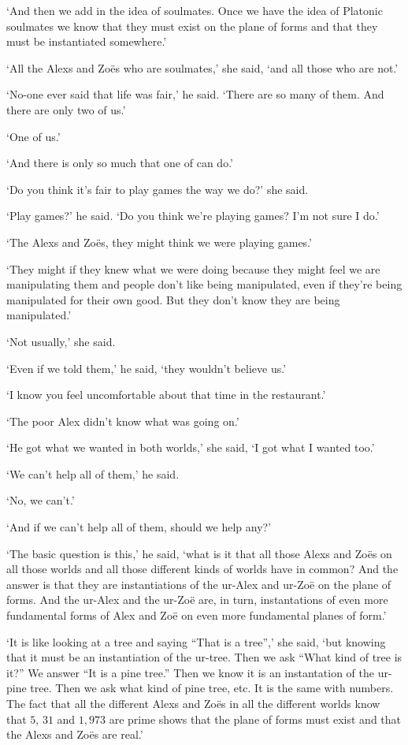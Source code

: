 `And then we add in the idea of soulmates. Once we have the {\twelveit idea\/} of Platonic soulmates we know that they must exist on the plane of forms and that they must be instantiated somewhere.'

`All the Alexs and Zoës who are soulmates,' she said, `and all those who are not.'

`No-one ever said that life was fair,' he said. `There are so many of them. And there are only two of us.'

`One of us.'

`And there is only so much that one of can do.'

`Do you think it's fair to play games the way we do?' she said.

`Play games?' he said. `Do you think we're playing games? I'm
not sure I do.'

`The Alexs and Zoës, they might think we were playing games.'

`They might if they knew what we were doing because they might feel we are manipulating them and people don't like being manipulated, even if they're being manipulated for their own good. But they don't know they are being manipulated.'

`Not usually,' she said.

`Even if we told them,' he said, `they wouldn't
believe us.'

`I know you feel uncomfortable about that time in the restaurant.'

`The poor Alex didn't know what was going on.'

`He got what we wanted in both worlds,' she said, `I got what I wanted too.'

`We can't help all of them,' he said.

`No, we can't.'

`And if we can't help all of them, should we help any?'

\majorbreak
`The basic question is this,' he said, `what is it that all those Alexs and Zoës on all those worlds and all those different kinds of worlds have in common? And the answer is that they are instantiations of the ur-Alex and ur-Zoë on the plane of forms. And the ur-Alex and the ur-Zoë are, in turn, instantations of even more fundamental forms of Alex and Zoë on even more fundamental planes of form.'

`It is like looking at a tree and saying ``That is a tree'',' she said, `but knowing that it must be an instantiation of the ur-tree. Then we ask ``What kind of tree is it?'' We answer ``It is a pine tree.'' Then we know it is an instantation of the ur-pine tree. Then we ask what kind of pine tree, etc. It is the same with numbers. The fact that all the different Alexs and Zoës in all the different worlds {\twelveit know\/} that $5$, $31$ and $1,973$ are prime shows that the plane of forms must exist and that the Alexs and Zoës are real.'

